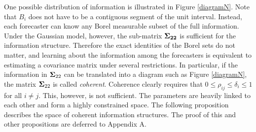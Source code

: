 \documentclass[12pt]{article}
\theoremstyle{definition}
\newtheorem{example}[theorem]{Example}
\theoremstyle{definition}
\begin{document}
One possible distribution of information is illustrated in Figure \ref{diagramN}. Note that $B_i$ does not have to be a contiguous segment of the unit
interval.  Instead, each forecaster can know any Borel measurable
subset of the full information. Under the Gaussian model, however, the sub-matrix ${\bf \Sigma_{22}}$ is sufficient for the information structure. Therefore the exact identities of the Borel sets do not matter, and learning about the
information among the forecasters is equivalent to estimating a
covariance matrix under several restrictions.  In particular, if the
information in ${\bf\Sigma}_{22}$ can be translated into a diagram
such as Figure \ref{diagramN},
the matrix ${\bf\Sigma}_{22}$ is called \textit{coherent}.  Coherence
clearly requires that $0 \leq \rho_{ij} \leq \delta_i \leq 1$ for all $i \neq j$.  This, however, is not sufficient. The parameters are heavily linked to each other and form a highly constrained space. 
%
The following proposition describes the space of coherent information structures.
 The proof of this and other propositions are deferred to Appendix A.
\end{document}
